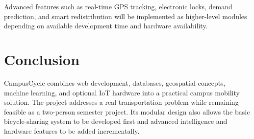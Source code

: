 \documentclass[12pt,a4paper]{article}
\begin{document}
Advanced features such as real-time GPS tracking, electronic locks, demand prediction, and smart redistribution will be implemented as higher-level modules depending on available development time and hardware availability.

\section{Conclusion}

CampusCycle combines web development, databases, geospatial concepts, machine learning, and optional IoT hardware into a practical campus mobility solution. The project addresses a real transportation problem while remaining feasible as a two-person semester project. Its modular design also allows the basic bicycle-sharing system to be developed first and advanced intelligence and hardware features to be added incrementally.
\end{document}
